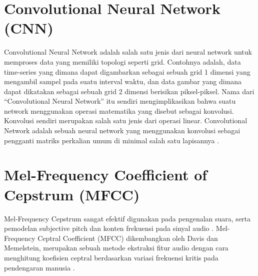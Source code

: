 \section{Convolutional Neural Network (CNN)}
\label{sec:cnn}
Convolutional Neural Network adalah salah satu jenis dari neural network untuk memproses data yang memiliki topologi seperti grid. Contohnya adalah, data time-series yang dimana dapat digambarkan sebagai sebuah grid 1 dimensi yang mengambil sampel pada suatu interval waktu, dan data gambar yang dimana dapat dikatakan sebagai sebuah grid 2 dimensi berisikan piksel-piksel. Nama dari “Convolutional Neural Network” itu sendiri mengimplikasikan bahwa suatu network menggunakan operasi matematika yang disebut sebagai konvolusi. Konvolusi sendiri merupakan salah satu jenis dari operasi linear. Convolutional Network adalah sebuah neural network yang menggunakan konvolusi sebagai pengganti matriks perkalian umum di minimal salah satu lapisannya \citep{deepL}.

\section{Mel-Frequency Coefficient of Cepstrum (MFCC)}
\label{sec:mfcc}
Mel-Frequency Cepstrum sangat efektif digunakan pada pengenalan suara, serta pemodelan subjective pitch dan konten frekuensi pada sinyal audio \citep{hmmaudio}. Mel-Frequency Ceptral Coefficient (MFCC) dikembangkan oleh Davis dan Memelstein, merupakan sebuah metode ekstraksi fitur audio dengan cara menghitung koefisien ceptral berdasarkan variasi frekuensi kritis pada pendengaran manusia \citep{Widodo2017PenerapanMM}.